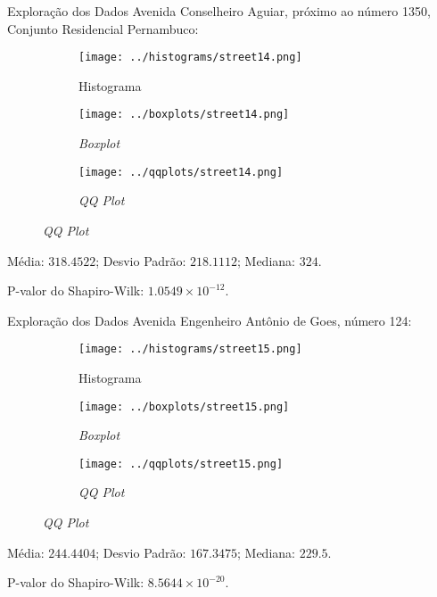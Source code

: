 \begin{frame}{Exploração dos Dados}
Avenida Conselheiro Aguiar, próximo ao número 1350, Conjunto Residencial
Pernambuco:
\begin{figure}
	\centering
	\begin{subfigure}{.33\textwidth}
		\centering
		\texttt{[image: ../histograms/street14.png]}
		\caption*{Histograma}
	\end{subfigure}%
	\begin{subfigure}{.33\textwidth}
		\centering
		\texttt{[image: ../boxplots/street14.png]}
		\caption*{\textit{Boxplot}}
	\end{subfigure}
	\begin{subfigure}{.32\textwidth}
		\centering
		\texttt{[image: ../qqplots/street14.png]}
		\caption*{\textit{QQ Plot}}
	\end{subfigure}
\end{figure}
Média: $318.4522$; Desvio Padrão: $218.1112$; Mediana: $324$.

P-valor do Shapiro-Wilk: $1.0549 \times 10^{-12}$.
\end{frame}

\begin{frame}{Exploração dos Dados}
Avenida Engenheiro Antônio de Goes, número 124:
\vskip 0.05cm
\begin{figure}
	\centering
	\begin{subfigure}{.33\textwidth}
		\centering
		\texttt{[image: ../histograms/street15.png]}
		\caption*{Histograma}
	\end{subfigure}%
	\begin{subfigure}{.33\textwidth}
		\centering
		\texttt{[image: ../boxplots/street15.png]}
		\caption*{\textit{Boxplot}}
	\end{subfigure}
	\begin{subfigure}{.32\textwidth}
		\centering
		\texttt{[image: ../qqplots/street15.png]}
		\caption*{\textit{QQ Plot}}
	\end{subfigure}
\end{figure}
\vskip 0.05cm
Média: $244.4404$; Desvio Padrão: $167.3475$; Mediana: $229.5$.

P-valor do Shapiro-Wilk: $8.5644 \times 10^{-20}$.
\end{frame}


